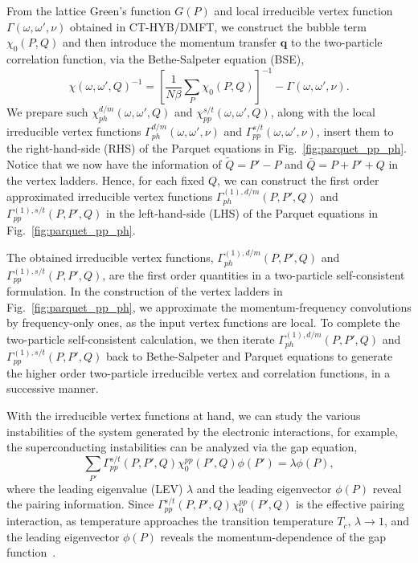From the lattice Green's function $G(P)$ and local irreducible vertex function $\Gamma(\omega,\omega',\nu)$ obtained in CT-HYB/DMFT, we construct the bubble term $\chi_0(P,Q)$ and then introduce the momentum transfer $\mathbf{q}$ to the two-particle correlation function, via the Bethe-Salpeter equation (BSE), 
\begin{equation}
\chi(\omega,\omega',Q)^{-1} = \left[\frac{1}{N\beta}\sum_{P}\chi_0(P,Q)\right]^{-1} - \Gamma(\omega,\omega',\nu).
\end{equation}
 We prepare such $\chi^{d/m}_{ph}(\omega,\omega',Q)$ and $\chi^{s/t}_{pp}(\omega,\omega',Q)$, along with the local irreducible vertex functions $\Gamma^{d/m}_{ph}(\omega, \omega',\nu)$ and $\Gamma^{s/t}_{pp}(\omega,\omega',\nu)$, insert them to the right-hand-side (RHS) of the Parquet equations in Fig.~\ref{fig:parquet_pp_ph}. Notice that we now have the information of $\tilde{Q}=P'-P$ and $\bar{Q}=P+P'+Q$ in the vertex ladders. Hence, for each fixed $Q$, we can construct the first order approximated irreducible vertex functions $\Gamma^{(1),d/m}_{ph}(P,P',Q)$ and $\Gamma^{(1),s/t}_{pp}(P,P',Q)$ in the left-hand-side (LHS) of the Parquet equations in Fig.~\ref{fig:parquet_pp_ph}.

The obtained irreducible vertex functions, $\Gamma^{(1),d/m}_{ph}(P,P',Q)$ and $\Gamma^{(1),s/t}_{pp}(P,P',Q)$, are the first order quantities in a two-particle self-consistent formulation. In the construction of the vertex ladders in Fig.~\ref{fig:parquet_pp_ph}, we approximate the momentum-frequency convolutions by frequency-only ones, as the input vertex functions are local. To complete the two-particle self-consistent calculation, we then iterate $\Gamma^{(1),d/m}_{ph}(P,P',Q)$ and $\Gamma^{(1),s/t}_{pp}(P,P',Q)$ back to Bethe-Salpeter and Parquet equations to generate the higher order two-particle irreducible vertex and correlation functions, in a successive manner. 

With the irreducible vertex functions at hand, we can study the various instabilities of the system generated by the electronic interactions, for example, the superconducting instabilities can be analyzed via the gap equation, 
\begin{equation}
\label{eq:gapeq}
\sum_{P'}\Gamma^{s/t}_{pp}(P,P',Q)\chi^{pp}_0(P',Q)\phi(P') = \lambda \phi(P),
\end{equation}
where the leading eigenvalue (LEV) $\lambda$ and the leading eigenvector $\phi(P)$ reveal the pairing information. Since $\Gamma^{s/t}_{pp}(P,P',Q)\chi^{pp}_{0}(P',Q)$ is the effective pairing interaction, as temperature approaches the transition temperature $T_{c}$, $\lambda \to 1$, and the leading eigenvector $\phi(P)$ reveals the momentum-dependence of the gap function~\cite{PhysRevB.88.041103,Meng14a,Meng14b}.

